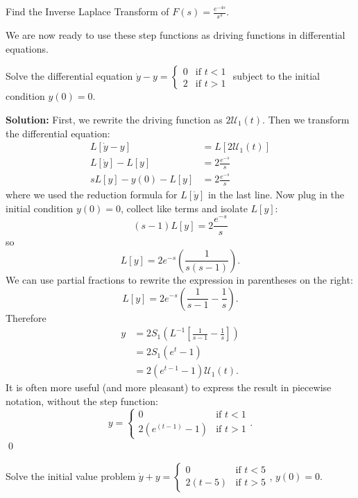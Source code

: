 {{{\begin{exe}
Find the Inverse Laplace Transform of $F(s)=\frac{e^{-4s}}{s^3}$.
\end{exe}

We are now ready to use these step functions as driving functions in differential equations.

\example Solve the differential  equation $\dot{y}-y = \begin{cases} 0 & \mbox{if } t < 1 \\ 2 & \mbox{if } t > 1 \end{cases}$ subject to the initial condition $y(0)=0$.

{\bf Solution:} First, we rewrite the driving function as $2\mathcal{U}_1(t)$.  Then we transform the differential equation:
\begin{align*}
L [ \dot{y} - y ] & = L [ 2\mathcal{U}_1(t)] \\
L[\dot{y}] - L[y] & = 2 \frac{e^{-s}}{s} \\
s L[y]-y(0)-L[y] & = 2 \frac{e^{-s}}{s}
\end{align*}
where we used the reduction formula for $L[\dot{y}]$ in the last line.  Now plug in the initial condition $y(0)=0$, collect like terms and isolate $L[y]$:
\[ (s-1)L[y] = 2 \frac{e^{-s}}{s}\]
so
\[ L[y] = 2e^{-s} \left( \frac{1}{s(s-1)} \right).\]
We can use partial fractions to rewrite the expression in parentheses on the right:
\[ L[y] = 2e^{-s} \left( \frac{1}{s-1}-\frac{1}{s} \right).\]
Therefore
\begin{align*}
y & = 2S_1 \left( L^{-1} \left[ \frac{1}{s-1}-\frac{1}{s} \right] \right) \\
& = 2S_1 \left( e^t -1 \right) \\
& = 2 \left( e^{t-1}-1 \right) \mathcal{U}_1(t).
\end{align*}
It is often more useful (and more pleasant) to express the result in piecewise notation, without the step function:
\[ y = \begin{cases} 0 & \mbox{if } t < 1 \\ 2(e^{(t-1)}-1) & \mbox{if } t > 1 \end{cases}.\]
\qed

\example Solve the initial value problem $\dot{y}+y = \begin{cases} 0 & \mbox{if } t<5 \\ 2(t-5) & \mbox{if } t > 5 \end{cases}$, $y(0)=0$.

}}}
